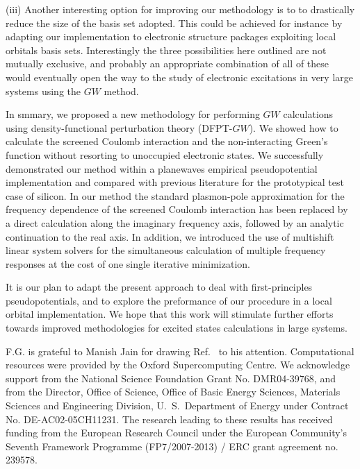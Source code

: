 \documentclass[twocolumn,prb,showpacs,superscriptaddress]{revtex4}
\begin{document}
(iii) Another interesting option for improving our methodology is to
to drastically reduce the size of the basis set adopted. This could be achieved
for instance by adapting our implementation to electronic structure packages
exploiting local orbitals basis sets.\cite{siesta}
Interestingly the three possibilities here outlined are not mutually exclusive,
and probably an appropriate combination of all of these would eventually open
the way to the study of electronic excitations in
very large systems using the $GW$ method.

In smmary, we proposed a new methodology for performing $GW$ calculations
using density-functional perturbation theory (DFPT-$GW$). We showed how
to calculate the screened Coulomb interaction and the non-interacting
Green's function without resorting to unoccupied electronic states.
We successfully demonstrated our method within a planewaves empirical
pseudopotential implementation and compared with previous literature for the
prototypical test case of silicon. In our method the standard plasmon-pole
approximation for the frequency dependence of the screened Coulomb interaction
has been replaced by a direct calculation along the imaginary frequency axis,
followed by an analytic continuation to the real axis.
In addition, we introduced the use of multishift linear system solvers for the simultaneous
calculation of multiple frequency responses at the cost of one single
iterative minimization.

It is our plan to adapt the present approach to deal with first-principles
pseudopotentials, and to explore the preformance of our procedure in a local
orbital implementation. We hope that this work will stimulate further efforts
towards improved methodologies for excited states calculations in large systems.

\begin{acknowledgments}
F.G. is grateful to Manish Jain for drawing Ref.\  to his attention.
Computational resources were provided by the Oxford Supercomputing Centre.
We acknowledge support from the National Science Foundation Grant No. DMR04-39768, and from
the Director, Office of Science, Office of Basic Energy Sciences, Materials Sciences
and Engineering Division, U.\ S.\ Department of Energy under Contract No. DE-AC02-05CH11231.
The research leading to these results has received funding from the European Research
Council under the European Community's Seventh Framework Programme (FP7/2007-2013) / ERC 
grant agreement no. 239578.

\end{acknowledgments}
\end{document}

